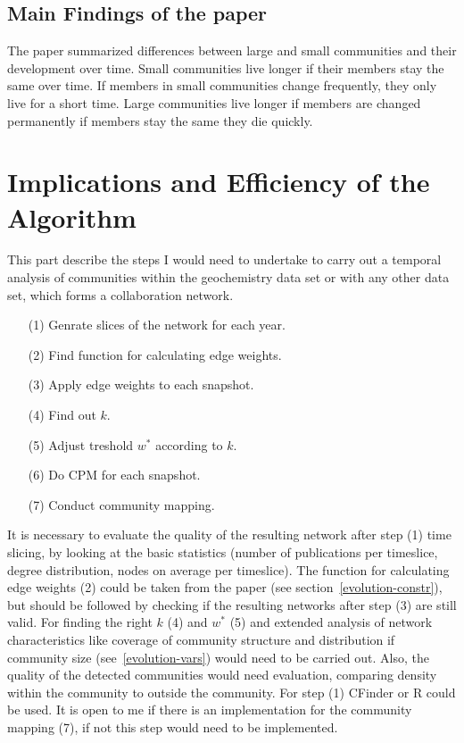 \documentclass[runningheads,a4paper]{llncs}
\begin{document}
\subsection{Main Findings of the paper}
\label{evolution-findings}
The paper summarized differences between large and small communities and their development over time. Small communities live longer if their members stay the same over time. If members in small communities change frequently, they only live for a short time. Large communities live longer if members are changed permanently if members stay the same they die quickly.

\section{Implications and Efficiency of the Algorithm}
This part describe the steps I would need to undertake to carry out a temporal analysis of communities within the geochemistry data set or with any other data set, which forms a collaboration network.

\noindent
\colorbox{usethiscolorhere}{
\begin{minipage}{\dimexpr\textwidth-2\fboxsep}

\begin{enumerate}
\small
	\item[(1)] Genrate slices of the network for each year.
	\item[(2)] Find function for calculating edge weights.
	\item[(3)] Apply edge weights to each snapshot.
	\item[(4)] Find out $k$.
	\item[(5)] Adjust treshold $w^*$ according to $k$.	
	\item[(6)] Do CPM for each snapshot.
	\item[(7)] Conduct community mapping.
\end{enumerate}

\end{minipage}
}

It is necessary to evaluate the quality of the resulting network after step (1) time slicing, by looking at the basic statistics (number of publications per timeslice, degree distribution, nodes on average per timeslice).
The function for calculating edge weights (2) could be taken from the paper (see section~\ref{evolution-constr}), but should be followed by checking if the resulting networks after step (3) are still valid.
For finding the right $k$ (4) and $w^*$ (5) and extended analysis of network characteristics like coverage of community structure and distribution if community size (see~\ref{evolution-vars}) would need to be carried out.
Also, the quality of the detected communities would need evaluation, comparing density within the community to outside the community.
For step (1) CFinder or R could be used.
It is open to me if there is an implementation for the community mapping (7), if not this step would need to be implemented.
\end{document}
